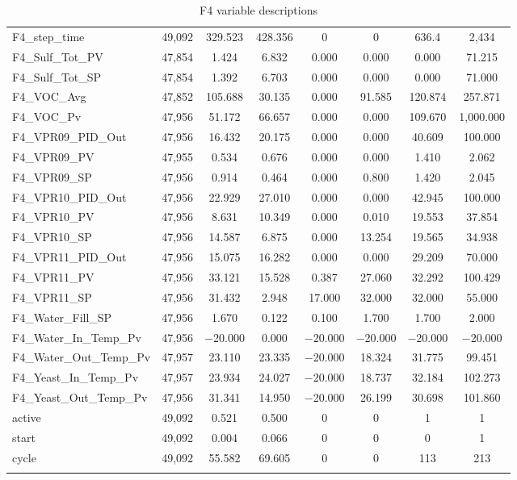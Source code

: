 \begin{table}[!htbp]
{\begin{tabular}{@{\extracolsep{5pt}}lccccccc}
F4\_step\_time & 49,092 & 329.523 & 428.356 & 0 & 0 & 636.4 & 2,434 \\ 
F4\_Sulf\_Tot\_PV & 47,854 & 1.424 & 6.832 & 0.000 & 0.000 & 0.000 & 71.215 \\ 
F4\_Sulf\_Tot\_SP & 47,854 & 1.392 & 6.703 & 0.000 & 0.000 & 0.000 & 71.000 \\ 
F4\_VOC\_Avg & 47,852 & 105.688 & 30.135 & 0.000 & 91.585 & 120.874 & 257.871 \\ 
F4\_VOC\_Pv & 47,956 & 51.172 & 66.657 & 0.000 & 0.000 & 109.670 & 1,000.000 \\ 
F4\_VPR09\_PID\_Out & 47,956 & 16.432 & 20.175 & 0.000 & 0.000 & 40.609 & 100.000 \\ 
F4\_VPR09\_PV & 47,955 & 0.534 & 0.676 & 0.000 & 0.000 & 1.410 & 2.062 \\ 
F4\_VPR09\_SP & 47,956 & 0.914 & 0.464 & 0.000 & 0.800 & 1.420 & 2.045 \\ 
F4\_VPR10\_PID\_Out & 47,956 & 22.929 & 27.010 & 0.000 & 0.000 & 42.945 & 100.000 \\ 
F4\_VPR10\_PV & 47,956 & 8.631 & 10.349 & 0.000 & 0.010 & 19.553 & 37.854 \\ 
F4\_VPR10\_SP & 47,956 & 14.587 & 6.875 & 0.000 & 13.254 & 19.565 & 34.938 \\ 
F4\_VPR11\_PID\_Out & 47,956 & 15.075 & 16.282 & 0.000 & 0.000 & 29.209 & 70.000 \\ 
F4\_VPR11\_PV & 47,956 & 33.121 & 15.528 & 0.387 & 27.060 & 32.292 & 100.429 \\ 
F4\_VPR11\_SP & 47,956 & 31.432 & 2.948 & 17.000 & 32.000 & 32.000 & 55.000 \\ 
F4\_Water\_Fill\_SP & 47,956 & 1.670 & 0.122 & 0.100 & 1.700 & 1.700 & 2.000 \\ 
F4\_Water\_In\_Temp\_Pv & 47,956 & $-$20.000 & 0.000 & $-$20.000 & $-$20.000 & $-$20.000 & $-$20.000 \\ 
F4\_Water\_Out\_Temp\_Pv & 47,957 & 23.110 & 23.335 & $-$20.000 & 18.324 & 31.775 & 99.451 \\ 
F4\_Yeast\_In\_Temp\_Pv & 47,957 & 23.934 & 24.027 & $-$20.000 & 18.737 & 32.184 & 102.273 \\ 
F4\_Yeast\_Out\_Temp\_Pv & 47,956 & 31.341 & 14.950 & $-$20.000 & 26.199 & 30.698 & 101.860 \\ 
active & 49,092 & 0.521 & 0.500 & 0 & 0 & 1 & 1 \\ 
start & 49,092 & 0.004 & 0.066 & 0 & 0 & 0 & 1 \\ 
cycle & 49,092 & 55.582 & 69.605 & 0 & 0 & 113 & 213 \\ 
\hline \\[-1.8ex] 
\end{tabular} 
}
  \caption{F4 variable descriptions} 
  \label{tab:f4} 
\end{table} 